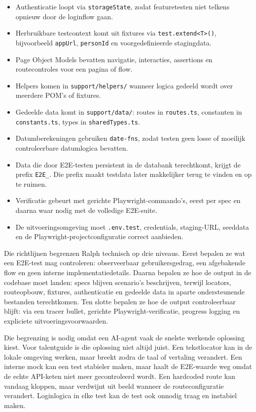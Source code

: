 \begin{itemize}
    \item Authenticatie loopt via \texttt{storageState}, zodat featuretesten niet telkens opnieuw door de loginflow gaan.
    \item Herbruikbare testcontext komt uit fixtures via \texttt{test.extend<T>()}, bijvoorbeeld \texttt{appUrl}, \texttt{personId} en voorgedefinieerde stagingdata.
    \item Page Object Models bevatten navigatie, interacties, assertions en routecontroles voor een pagina of flow.
    \item Helpers komen in \texttt{support/helpers/} wanneer logica gedeeld wordt over meerdere POM's of fixtures.
    \item Gedeelde data komt in \texttt{support/data/}: routes in \texttt{routes.ts}, constanten in \texttt{constants.ts}, types in \texttt{sharedTypes.ts}.
    \item Datumberekeningen gebruiken \texttt{date-fns}, zodat testen geen losse of moeilijk controleerbare datumlogica bevatten.
    \item Data die door E2E-testen persistent in de databank terechtkomt, krijgt de prefix \texttt{E2E\_}. Die prefix maakt testdata later makkelijker terug te vinden en op te ruimen.
    \item Verificatie gebeurt met gerichte Playwright-commando's, eerst per spec en daarna waar nodig met de volledige E2E-suite.
    \item De uitvoeringsomgeving moet \texttt{.env.test}, credentials, staging-URL, seeddata en de Playwright-projectconfiguratie correct aanbieden.
\end{itemize}

Die richtlijnen begrenzen Ralph technisch op drie niveaus. Eerst bepalen ze wat een E2E-test mag controleren: observeerbaar gebruikersgedrag, een afgebakende flow en geen interne implementatiedetails. Daarna bepalen ze hoe de output in de codebase moet landen: specs blijven scenario's beschrijven, terwijl locators, routeopbouw, fixtures, authenticatie en gedeelde data in aparte ondersteunende bestanden terechtkomen. Ten slotte bepalen ze hoe de output controleerbaar blijft: via een tracer bullet, gerichte Playwright-verificatie, progress logging en expliciete uitvoeringsvoorwaarden.

Die begrenzing is nodig omdat een AI-agent vaak de snelste werkende oplossing kiest. Voor talentguide is die oplossing niet altijd juist. Een tekstlocator kan in de lokale omgeving werken, maar breekt zodra de taal of vertaling verandert. Een interne mock kan een test stabieler maken, maar haalt de E2E-waarde weg omdat de echte API-keten niet meer gecontroleerd wordt. Een hardcoded route kan vandaag kloppen, maar verdwijnt uit beeld wanneer de routeconfiguratie verandert. Loginlogica in elke test kan de test ook onnodig traag en instabiel maken.

